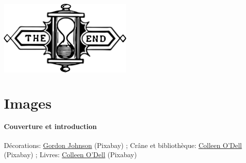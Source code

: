 \documentclass[a5paper,pagesize,10pt,bibliography=totoc,numbers=enddot,
headings=normal,DIV=9,twoside=false,tablecaptionabove]{scrbook}
\begin{document}
\onecolumn
\begingroup
\let\clearpage\relax
\label{index}
\printindex[cadre]
\printindex[genre]
\newpage
\printindex[theme]
\begin{center}
\includegraphics[width=0.5\textwidth]{images/end}
\end{center}
\clearpage

\newpage
\vspace*{-4em}
\chapter*{Images}
\vspace{-1.5em}
\small
\newcommand\creditimg[4]{%
	#1: \href{#3}{#2} (#4)
}%
\newcommand\cczero{CC0}
\newcommand\pixabay{Pixabay}
\subsubsection*{Couverture et introduction}
\creditimg{Décorations}{Gordon Johnson}{https://pixabay.com/fr/vectors/vintage-cadre-dessin-au-trait-f\%C3\%A9e-5138621/}{\pixabay};
\creditimg{Crâne et bibliothèque}{Colleen O'Dell}{https://pixabay.com/fr/vectors/cr\%C3\%A2ne-la-biblioth\%C3\%A8que-assistant-4109212/}{\pixabay};
\creditimg{Livres}{Colleen O'Dell}{https://pixabay.com/fr/vectors/livres-la-biblioth\%C3\%A8que-plateau-4109214/}{\pixabay}
\end{document}
